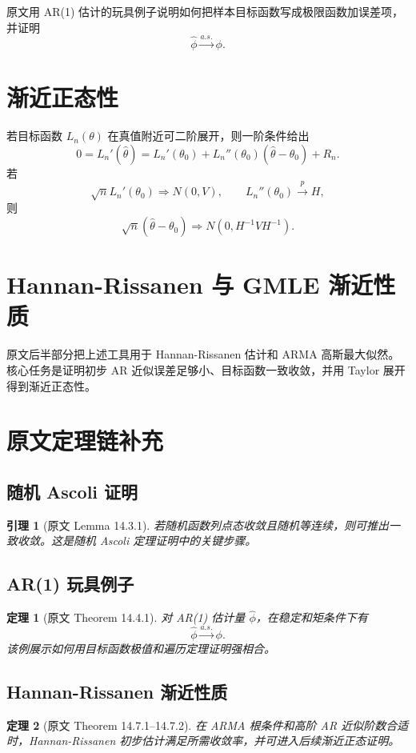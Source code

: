 \documentclass[11pt,a4paper,openany]{ctexbook}
\newtheorem{theorem}{定理}[section]
\newtheorem{lemma}{引理}[section]
\begin{document}
原文用 AR(1) 估计的玩具例子说明如何把样本目标函数写成极限函数加误差项，并证明
\[
  \hat\phi\xrightarrow{a.s.}\phi.
\]

\section{渐近正态性}

若目标函数 \(L_n(\theta)\) 在真值附近可二阶展开，则一阶条件给出
\[
  0=L_n'(\hat\theta)
  =L_n'(\theta_0)+L_n''(\theta_0)(\hat\theta-\theta_0)+R_n.
\]
若
\[
  \sqrt n L_n'(\theta_0)\Rightarrow N(0,V),
  \qquad
  L_n''(\theta_0)\xrightarrow{p}H,
\]
则
\[
  \sqrt n(\hat\theta-\theta_0)\Rightarrow N(0,H^{-1}VH^{-1}).
\]

\section{Hannan-Rissanen 与 GMLE 渐近性质}

原文后半部分把上述工具用于 Hannan-Rissanen 估计和 ARMA 高斯最大似然。核心任务是证明初步 AR 近似误差足够小、目标函数一致收敛，并用 Taylor 展开得到渐近正态性。

\section{原文定理链补充}

\subsection{随机 Ascoli 证明}
\begin{lemma}[原文 Lemma 14.3.1]
若随机函数列点态收敛且随机等连续，则可推出一致收敛。这是随机 Ascoli 定理证明中的关键步骤。
\end{lemma}

\subsection{AR(1) 玩具例子}
\begin{theorem}[原文 Theorem 14.4.1]
对 AR(1) 估计量 \(\hat\phi\)，在稳定和矩条件下有
\[
  \hat\phi\xrightarrow{a.s.}\phi.
\]
该例展示如何用目标函数极值和遍历定理证明强相合。
\end{theorem}

\subsection{Hannan-Rissanen 渐近性质}
\begin{theorem}[原文 Theorem 14.7.1--14.7.2]
在 ARMA 根条件和高阶 AR 近似阶数合适时，Hannan-Rissanen 初步估计满足所需收敛率，并可进入后续渐近正态证明。
\end{theorem}
\end{document}
